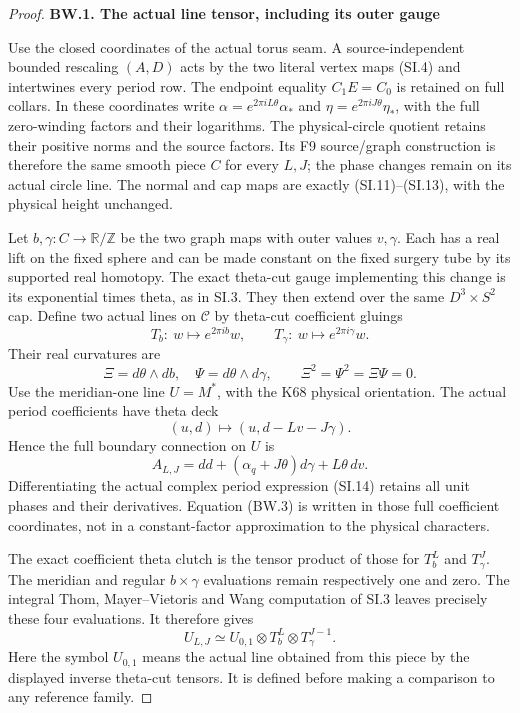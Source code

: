 \begin{proof}
\par

\medskip\noindent\textbf{BW.1. The actual line tensor, including its outer gauge}

\par\nobreak

Use the closed coordinates of the actual torus seam. A source-independent
bounded rescaling \((A,D)\) acts by the two literal vertex maps (SI.4)
and intertwines every period row. The endpoint equality \(C_1E=C_0\)
is retained on full collars. In these coordinates write
\(\alpha=e^{2\pi iL\theta}\alpha_*\) and
\(\eta=e^{2\pi iJ\theta}\eta_*\), with the full zero-winding factors
and their logarithms. The physical-circle quotient retains their
positive norms and the source factors. Its F9 source/graph construction
is therefore the same smooth piece \(C\) for every \(L,J\); the phase
changes remain on its actual circle line. The normal and cap maps
are exactly (SI.11)--(SI.13), with the physical height unchanged.

Let \(b,\gamma:C\to\mathbb R/\mathbb Z\) be the two graph maps with
outer values \(v,\gamma\). Each has a real lift on the fixed sphere
and can be made constant on the fixed surgery tube by its supported
real homotopy. The exact theta-cut gauge implementing this change
is its exponential times theta, as in SI.3. They then extend over the
same \(D^3\times S^2\) cap. Define two actual lines on \(\mathcal C\)
by theta-cut coefficient gluings
\[
 T_b:\ w\mapsto e^{2\pi ib}w,\qquad
 T_\gamma:\ w\mapsto e^{2\pi i\gamma}w.
\]
Their real curvatures are
\[
 \Xi=d\theta\wedge db,\quad \Psi=d\theta\wedge d\gamma,
 \qquad \Xi^2=\Psi^2=\Xi\Psi=0.                    \tag{BW.1}
\]
Use the meridian-one line \(U=M^*\), with the K68 physical orientation.
The actual period coefficients have theta deck
\[
 (u,d)\longmapsto(u,d-Lv-J\gamma).
                                                        \tag{BW.2}
\]
Hence the full boundary connection on \(U\) is
\[
 A_{L,J}=dd+(\alpha_q+J\theta)d\gamma+L\theta\,dv.
                                                        \tag{BW.3}
\]
Differentiating the actual complex period expression (SI.14) retains
all unit phases and their derivatives. Equation (BW.3) is written in
those full coefficient coordinates, not in a constant-factor
approximation to the physical characters.

The exact coefficient theta clutch is the tensor product of those
for \(T_b^L\) and \(T_\gamma^J\). The meridian and regular \(b\times\gamma\)
evaluations remain respectively one and zero. The integral Thom,
Mayer--Vietoris and Wang computation of SI.3 leaves precisely these
four evaluations. It therefore gives
\[
 U_{L,J}\simeq U_{0,1}\otimes T_b^L\otimes T_\gamma^{J-1}.
                                                        \tag{BW.4}
\]
Here the symbol \(U_{0,1}\) means the actual line obtained from this
piece by the displayed inverse theta-cut tensors. It is defined
before making a comparison to any reference family.


\end{proof}
